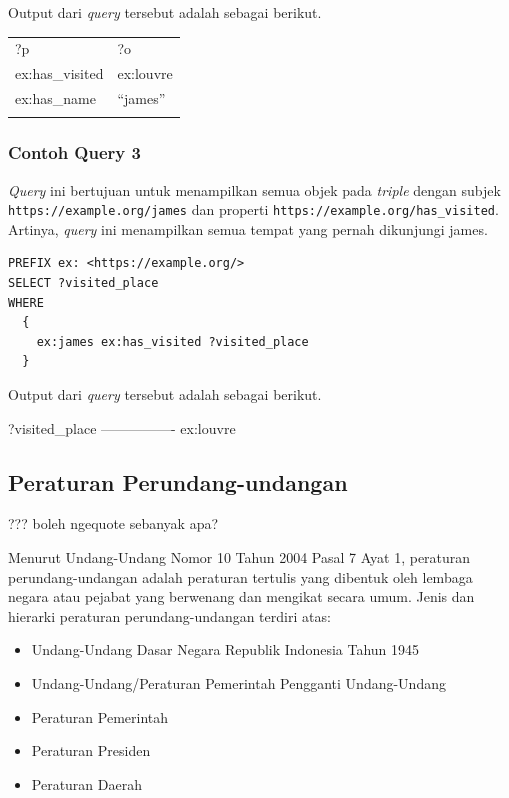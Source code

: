 Output dari \emph{query} tersebut adalah sebagai berikut.

\begin{longtable}[c]{@{}ll@{}}
\toprule\addlinespace
?p & ?o
\\\addlinespace
\midrule\endhead
ex:has\_visited & ex:louvre
\\\addlinespace
ex:has\_name & ``james''
\\\addlinespace
\bottomrule
\end{longtable}

\subsubsection{Contoh Query 3}\label{contoh-query-3}

\emph{Query} ini bertujuan untuk menampilkan semua objek pada
\emph{triple} dengan subjek \texttt{https://example.org/james} dan
properti \texttt{https://example.org/has\_visited}. Artinya,
\emph{query} ini menampilkan semua tempat yang pernah dikunjungi james.

\begin{verbatim}
PREFIX ex: <https://example.org/>
SELECT ?visited_place
WHERE
  {
    ex:james ex:has_visited ?visited_place
  }
\end{verbatim}

Output dari \emph{query} tersebut adalah sebagai berikut.

\textbar{} ?visited\_place \textbar{}
\textbar{}----------------\textbar{} \textbar{} ex:louvre \textbar{}

\subsection{Peraturan
Perundang-undangan}\label{peraturan-perundang-undangan}

??? boleh ngequote sebanyak apa?

Menurut Undang-Undang Nomor 10 Tahun 2004 Pasal 7 Ayat 1, peraturan
perundang-undangan adalah peraturan tertulis yang dibentuk oleh lembaga
negara atau pejabat yang berwenang dan mengikat secara umum. Jenis dan
hierarki peraturan perundang-undangan terdiri atas:

\begin{itemize}
\itemsep1pt\parskip0pt
\item
  Undang-Undang Dasar Negara Republik Indonesia Tahun 1945
\item
  Undang-Undang/Peraturan Pemerintah Pengganti Undang-Undang
\item
  Peraturan Pemerintah
\item
  Peraturan Presiden
\item
  Peraturan Daerah
\end{itemize}

